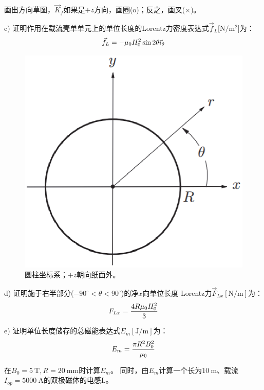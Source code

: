 画出方向草图，$\vec{K}_f$如果是$+z$方向，画圈(o)；反之，画叉(×)。

c) 证明作用在载流壳单单元上的单位长度的Lorentz力密度表达式$\vec{f}_L$[$\mathrm{N/m^2}$]为：
\begin{equation}
\vec{f}_{L}=-\mu_{0}H_{0}^{2}\sin 2\theta\vec{\imath}_{\theta}\\%
\end{equation}

\begin{figure}[htbp]
	\centering
	\includegraphics[scale=0.5]{chpt3/figs/fig3.32.eps}
	\caption{圆柱坐标系；$+z$朝向纸面外。}
\end{figure}

d) 证明施于右半部分($−90^\circ<\theta<90^\circ$)的净$x$向单位长度
Lorentz力$\vec{F}_{Lx}[\mathrm{N/m}]$为：
\begin{equation}
F_{Lx}=\frac{4R\mu_{0}H_{0}^{2}}{3}\\%
\end{equation}

e) 证明单位长度储存的总磁能表达式$E_m[\mathrm{J/m}]$为：
\begin{equation}
E_{m}=\frac{\pi R^{2}B_{0}^{2}}{\mu_{0}}\\%
\end{equation}

在$B_0=5\ \mathrm{T},R=20\ \mathrm{mm}$时计算$E_m$。
同时，由$E_m$计算一个长为$10\ \mathrm{m}$、载流$I_{op}=5000\ \mathrm{A}$的双极磁体的电感L。

